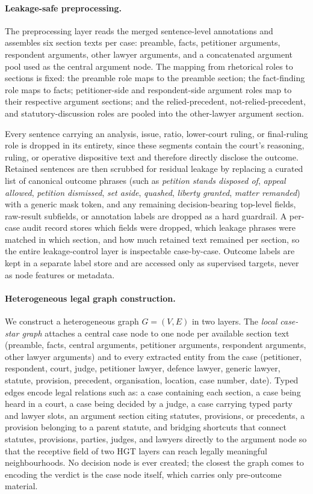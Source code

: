 \documentclass[runningheads]{llncs}
\begin{document}
\paragraph{Leakage-safe preprocessing.}
The preprocessing layer reads the merged sentence-level annotations and assembles six section texts per case: preamble, facts, petitioner arguments, respondent arguments, other lawyer arguments, and a concatenated argument pool used as the central argument node. The mapping from rhetorical roles to sections is fixed: the preamble role maps to the preamble section; the fact-finding role maps to facts; petitioner-side and respondent-side argument roles map to their respective argument sections; and the relied-precedent, not-relied-precedent, and statutory-discussion roles are pooled into the other-lawyer argument section.

Every sentence carrying an analysis, issue, ratio, lower-court ruling, or final-ruling role is dropped in its entirety, since these segments contain the court's reasoning, ruling, or operative dispositive text and therefore directly disclose the outcome. Retained sentences are then scrubbed for residual leakage by replacing a curated list of canonical outcome phrases (such as \emph{petition stands disposed of}, \emph{appeal allowed}, \emph{petition dismissed}, \emph{set aside}, \emph{quashed}, \emph{liberty granted}, \emph{matter remanded}) with a generic mask token, and any remaining decision-bearing top-level fields, raw-result subfields, or annotation labels are dropped as a hard guardrail. A per-case audit record stores which fields were dropped, which leakage phrases were matched in which section, and how much retained text remained per section, so the entire leakage-control layer is inspectable case-by-case. Outcome labels are kept in a separate label store and are accessed only as supervised targets, never as node features or metadata.

\paragraph{Heterogeneous legal graph construction.}
We construct a heterogeneous graph $G = (V, E)$ in two layers. The \emph{local case-star graph} attaches a central case node to one node per available section text (preamble, facts, central arguments, petitioner arguments, respondent arguments, other lawyer arguments) and to every extracted entity from the case (petitioner, respondent, court, judge, petitioner lawyer, defence lawyer, generic lawyer, statute, provision, precedent, organisation, location, case number, date). Typed edges encode legal relations such as: a case containing each section, a case being heard in a court, a case being decided by a judge, a case carrying typed party and lawyer slots, an argument section citing statutes, provisions, or precedents, a provision belonging to a parent statute, and bridging shortcuts that connect statutes, provisions, parties, judges, and lawyers directly to the argument node so that the receptive field of two HGT layers can reach legally meaningful neighbourhoods. No decision node is ever created; the closest the graph comes to encoding the verdict is the case node itself, which carries only pre-outcome material.
\end{document}
